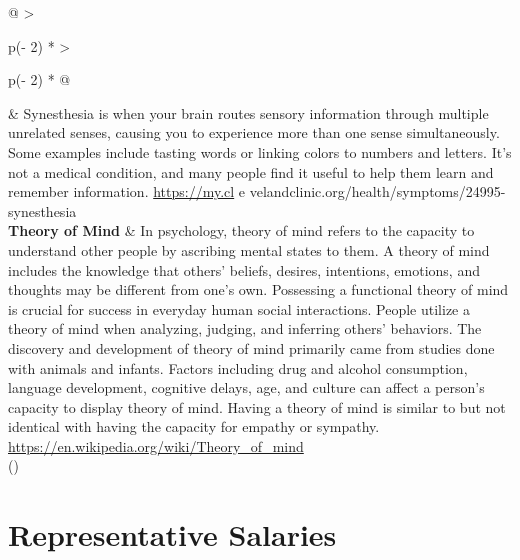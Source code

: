 \documentclass[
  letterpaper,
  DIV=11,
  numbers=noendperiod]{scrreprt}
\begin{document}
\begin{longtable}[]{@{}
  >{\raggedright\arraybackslash}p{(\columnwidth - 2\tabcolsep) * }
  >{\raggedright\arraybackslash}p{(\columnwidth - 2\tabcolsep) * }@{}}
\begin{minipage}[t]{\linewidth}
\end{minipage} & Synesthesia is when your brain routes sensory
information through multiple unrelated senses, causing you to experience
more than one sense simultaneously. Some examples include tasting words
or linking colors to numbers and letters. It's not a medical condition,
and many people find it useful to help them learn and remember
information. \url{https://my.cl} e
velandclinic.org/health/symptoms/24995-synesthesia \\
\textbf{Theory of Mind} & In psychology, theory of mind refers to the
capacity to understand other people by ascribing mental states to them.
A theory of mind includes the knowledge that others' beliefs, desires,
intentions, emotions, and thoughts may be different from one's own.
Possessing a functional theory of mind is crucial for success in
everyday human social interactions. People utilize a theory of mind when
analyzing, judging, and inferring others' behaviors. The discovery and
development of theory of mind primarily came from studies done with
animals and infants. Factors including drug and alcohol consumption,
language development, cognitive delays, age, and culture can affect a
person's capacity to display theory of mind. Having a theory of mind is
similar to but not identical with having the capacity for empathy or
sympathy. \url{https://en.wikipedia.org/wiki/Theory_of_mind} \\
\bottomrule()
\end{longtable}

\hypertarget{section-6}{%
\chapter{}\label{section-6}}

\hypertarget{appendix-representative-salaries}{%
\chapter{Representative
Salaries}\label{appendix-representative-salaries}}
\end{document}

